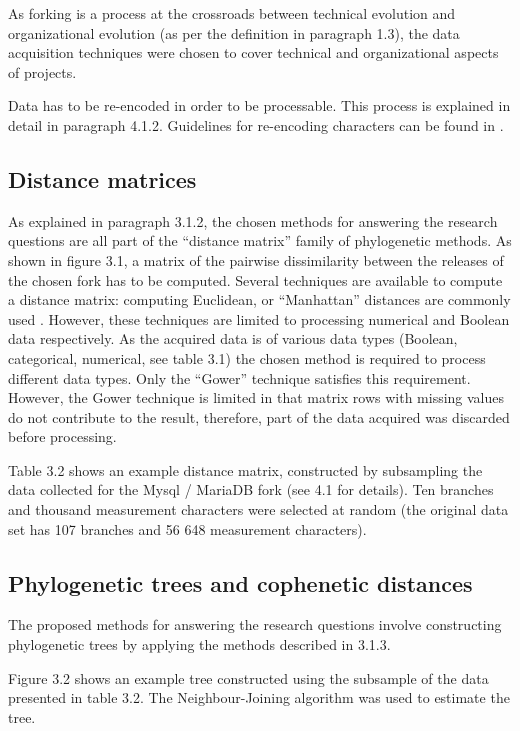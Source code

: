As forking is a process at the crossroads between technical evolution and organizational evolution (as per the definition in paragraph 1.3), the data acquisition techniques were chosen to cover technical and organizational aspects of projects.

Data has to be re-encoded in order to be processable. This process is explained in detail in paragraph 4.1.2. Guidelines for re-encoding characters can be found in \citet{Sokal1986a}.

\subsection{Distance matrices}
As explained in paragraph 3.1.2, the chosen methods for answering the research questions are all part of the “distance matrix” family of phylogenetic methods. As shown in figure 3.1, a matrix of the pairwise dissimilarity between the releases of the chosen fork has to be computed. Several techniques are available to compute a distance matrix: computing Euclidean, or “Manhattan” distances are commonly used \citep{Felsenstein1982a}. However, these techniques are limited to processing numerical and Boolean data respectively. As the acquired data is of various data types (Boolean, categorical, numerical, see table 3.1) the chosen method is required to process different data types. Only the “Gower” technique \citep{DOrazio2016} satisfies this requirement. However, the Gower technique is limited in that matrix rows with missing values do not contribute to the result, therefore, part of the data acquired was discarded before processing.

Table 3.2 shows an example distance matrix, constructed by subsampling the data collected for the Mysql / MariaDB fork (see 4.1 for details). Ten branches and thousand measurement characters were selected at random (the original data set has 107 branches and 56 648 measurement characters).

\subsection{Phylogenetic trees and cophenetic distances}
The proposed methods for answering the research questions involve constructing phylogenetic trees by applying the methods described in 3.1.3.

Figure 3.2 shows an example tree constructed using the subsample of the data presented in table 3.2. The Neighbour-Joining algorithm \citep{Saitou1987a} was used to estimate the tree.

